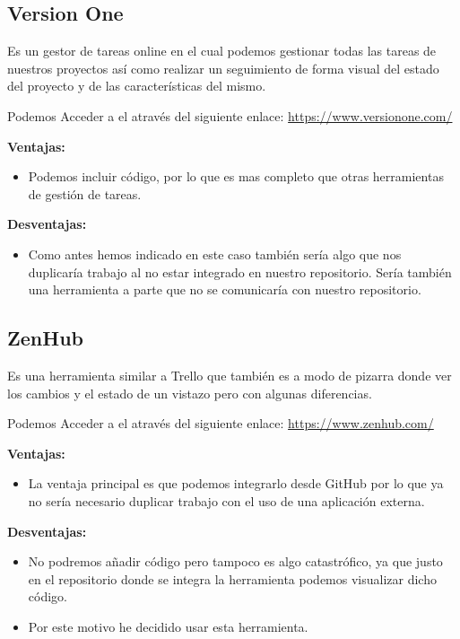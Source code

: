\subsection{Version One}
Es un gestor de tareas online en el cual podemos gestionar todas las tareas de nuestros proyectos así como realizar un seguimiento de forma visual del estado del proyecto y de las características del mismo.

Podemos Acceder a el através del siguiente enlace: 
\url{https://www.versionone.com/}


\textbf{Ventajas:}

\begin{itemize}
\item Podemos incluir código, por lo que es mas completo que otras herramientas de gestión de tareas.
\end{itemize}

\textbf{Desventajas:}

\begin{itemize}
\item Como antes hemos indicado en este caso también sería algo que nos duplicaría trabajo al no estar integrado en nuestro repositorio. Sería también una herramienta a parte que no se comunicaría con nuestro repositorio.
\end{itemize}


\subsection{ZenHub}
Es una herramienta similar a Trello que también es a modo de pizarra donde ver los cambios y el estado de un vistazo pero con algunas diferencias.

Podemos Acceder a el através del siguiente enlace: 
\url{https://www.zenhub.com/}



\textbf{Ventajas:}

\begin{itemize}
\item La ventaja principal es que podemos integrarlo desde GitHub por lo que ya no sería necesario duplicar trabajo con el uso de una aplicación externa.
\end{itemize}

\textbf{Desventajas:}

\begin{itemize}
\item No podremos añadir código pero tampoco es algo catastrófico, ya que justo en el repositorio donde se integra la herramienta podemos visualizar dicho código.

\item Por este motivo he decidido usar esta herramienta.
\end{itemize}

